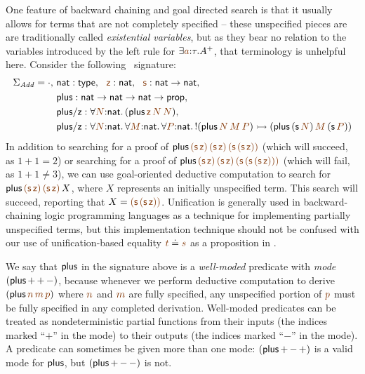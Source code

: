 One feature of backward chaining and goal directed search is that it
usually allows for terms that are not completely specified -- these
unspecified pieces are are traditionally called {\it existential
  variables}, but as they bear no relation to the variables introduced
by the left rule for $\exists \lf{a}{:}\tau. A^+$, 
that terminology is unhelpful
here. Consider the following \sls~signature:
\begin{align*}
 \Sigma_{\it Add} = \cdot, 
~&{\sf nat} : {\sf type}, 
~~\lf{\sf z} : {\sf nat}, 
~~\lf{\sf s} : {\sf nat} \rightarrow {\sf nat},\\
~&{\sf plus} : {\sf nat} \rightarrow {\sf nat} \rightarrow {\sf nat} 
                 \rightarrow {\sf prop},\\
~&{\sf plus/z} : \forall \lf{N}{:}{\sf nat}.\,
({\sf plus}\,\lf{\sf z}\,\lf{N}\,\lf{N}),\\
~&{\sf plus/z} : \forall \lf{N}{:}{\sf nat}.\, 
                 \forall \lf{M}{:}{\sf nat}.\, 
                 \forall \lf{P}{:}{\sf nat}.\,
{!}({\sf plus}\,\lf{N}\,\lf{M}\,\lf{P})
\lefti ({\sf plus}\,({\sf s}\,\lf{N})\,\lf{M}\,({\sf s}\,\lf{P}))
\end{align*}
In addition to searching for a proof of ${\sf plus}\,\lf{\sf
  (s\,z)}\,\lf{\sf (s\,z)}\,\lf{\sf (s\,(s\,z))}$ (which will succeed,
as $1 + 1 = 2$) or searching for a proof of ${\sf plus}\,\lf{\sf
  (s\,z)}\,\lf{\sf (s\,z)}\,\lf{\sf (s\,(s\,(s\,z)))}$ (which will
fail, as $1 + 1 \neq 3$), we can use goal-oriented deductive
computation to search for ${\sf plus}\,\lf{\sf (s\,z)}\,\lf{\sf
  (s\,z)}\,X$, where $X$ represents an initially unspecified term.
This search will succeed, reporting that $X = \lf{\sf
  (s\,(s\,z))}$. Unification is generally used in backward-chaining
logic programming languages as a technique for implementing partially
unspecified terms, but this implementation technique should not be
confused with our use of unification-based equality $\lf{t} \doteq
\lf{s}$ as a proposition in \sls.

We say that ${\sf plus}$ in the signature above is a {\it well-moded}
predicate with {\it mode} $({\sf plus}\,{+}\,{+}\,{-})$, because
whenever we perform deductive computation to derive $({\sf
  plus}\,\lf{n}\,\lf{m}\,\lf{p})$ where $\lf{n}$ and $\lf{m}$ are
fully specified, any unspecified portion of $\lf{p}$ must be fully
specified in any completed derivation. Well-moded predicates can be
treated as nondeterministic partial functions from their inputs (the
indices marked ``${+}$'' in the mode) to their outputs (the indices
marked ``${-}$'' in the mode). A predicate can sometimes be given more
than one mode: $({\sf plus}\,{+}\,{-}\,{+})$ is a valid mode for ${\sf
  plus}$, but $({\sf plus}\,{+}\,{-}\,{-})$ is not.

